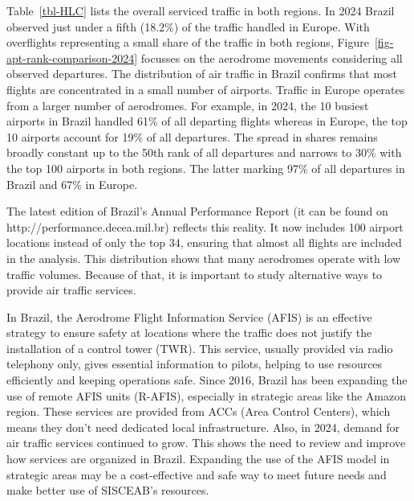 \documentclass[
  a4paper,
  DIV=11,
  numbers=noendperiod]{scrreport}
\begin{document}
Table~\ref{tbl-HLC} lists the overall serviced traffic in both regions.
In 2024 Brazil observed just under a fifth (18.2\%) of the traffic
handled in Europe. With overflights representing a small share of the
traffic in both regions, Figure~\ref{fig-apt-rank-comparison-2024}
focusses on the aerodrome movements considering all observed departures.
The distribution of air traffic in Brazil confirms that most flights are
concentrated in a small number of airports. Traffic in Europe operates
from a larger number of aerodromes. For example, in 2024, the 10 busiest
airports in Brazil handled 61\% of all departing flights whereas in
Europe, the top 10 airports account for 19\% of all departures. The
spread in shares remains broadly constant up to the 50th rank of all
departures and narrows to 30\% with the top 100 airports in both
regions. The latter marking 97\% of all departures in Brazil and 67\% in
Europe.

The latest edition of Brazil's Annual Performance Report (it can be
found on http://performance.decea.mil.br) reflects this reality. It now
includes 100 airport locations instead of only the top 34, ensuring that
almost all flights are included in the analysis. This distribution shows
that many aerodromes operate with low traffic volumes. Because of that,
it is important to study alternative ways to provide air traffic
services.

In Brazil, the Aerodrome Flight Information Service (AFIS) is an
effective strategy to ensure safety at locations where the traffic does
not justify the installation of a control tower (TWR). This service,
usually provided via radio telephony only, gives essential information
to pilots, helping to use resources efficiently and keeping operations
safe. Since 2016, Brazil has been expanding the use of remote AFIS units
(R-AFIS), especially in strategic areas like the Amazon region. These
services are provided from ACCs (Area Control Centers), which means they
don't need dedicated local infrastructure. Also, in 2024, demand for air
traffic services continued to grow. This shows the need to review and
improve how services are organized in Brazil. Expanding the use of the
AFIS model in strategic areas may be a cost-effective and safe way to
meet future needs and make better use of SISCEAB's resources.
\end{document}
